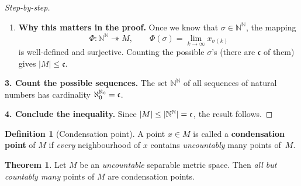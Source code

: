\documentclass[12pt]{article}
\theoremstyle{definition} %
\newtheorem{theorem}{Theorem}
\newtheorem{definition}{Definition}
\theoremstyle{plain} %
\begin{document}
\begin{proof}[Step-by-step]
\begin{enumerate}
  \item \textbf{Why this matters in the proof.}  
        Once we know that \(\sigma\in\mathbb N^{\mathbb N}\), the mapping
        \[
            \Phi:\mathbb N^{\mathbb N}\twoheadrightarrow M,
            \qquad
            \Phi(\sigma)=\lim_{k\to\infty}x_{\sigma(k)}
        \]
        is well‑defined and surjective.  
        Counting the possible \(\sigma\)’s (there are \(\mathfrak c\) of
        them) gives \(|M|\le\mathfrak c\).
\end{enumerate}
  \medskip
  \textbf{3.  Count the possible sequences.}\;
  The set $\mathbb N^{\mathbb N}$ of all sequences of natural numbers has
  cardinality $\aleph_0^{\aleph_0}=\frak c$.

  \medskip
  \textbf{4.  Conclude the inequality.}\;
  Since $|M|\le|\mathbb N^{\mathbb N}|=\frak c$, the result follows.
\end{proof}

\begin{definition}[Condensation point]
  A point $x\in M$ is called a \textbf{condensation point} of $M$ if
  \emph{every} neighbourhood of $x$ contains \emph{uncountably} many
  points of~$M$.
\end{definition}

\begin{theorem}\label{thm:condensation}
  Let $M$ be an \emph{uncountable} separable metric space.
  Then \emph{all but countably many} points of $M$ are
  condensation points.
\end{theorem}
\end{document}
